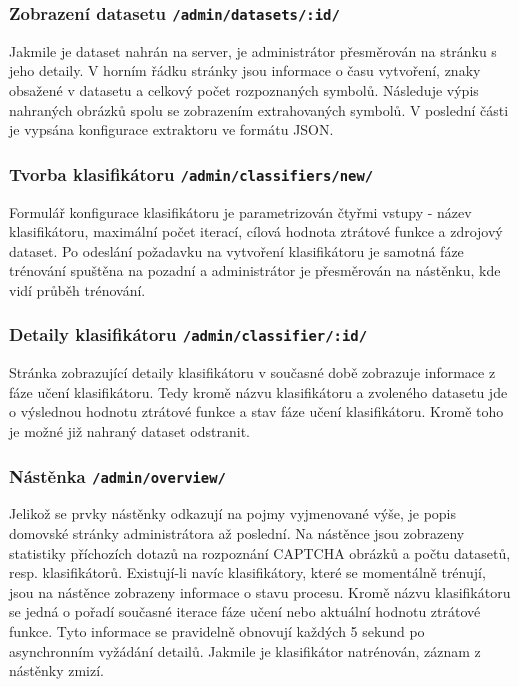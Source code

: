 \documentclass[
  field=ainfp,
  master=true,
  biblatex,
  sourcecodes=false,
  theorems=false,
  glossaries,
  index
]{kidiplom}
\begin{document}
\subsubsection*{Zobrazení datasetu \texttt{/admin/datasets/:id/}}
Jakmile je dataset nahrán na server, je administrátor přesměrován na stránku s jeho detaily. V horním řádku stránky jsou informace o času vytvoření, znaky obsažené v datasetu a celkový počet rozpoznaných symbolů. Následuje výpis nahraných obrázků spolu se zobrazením extrahovaných symbolů. V poslední části je vypsána konfigurace extraktoru ve formátu JSON. 

\subsubsection*{Tvorba klasifikátoru \texttt{/admin/classifiers/new/}}
Formulář konfigurace klasifikátoru je parametrizován čtyřmi vstupy - název klasifikátoru, maximální počet iterací, cílová hodnota ztrátové funkce a zdrojový dataset. Po odeslání požadavku na vytvoření klasifikátoru je samotná fáze trénování spuštěna na pozadní a administrátor je přesměrován na nástěnku, kde vidí průběh trénování.

\subsubsection*{Detaily klasifikátoru \texttt{/admin/classifier/:id/}}
Stránka zobrazující detaily klasifikátoru v současné době zobrazuje informace z fáze učení klasifikátoru. Tedy kromě názvu klasifikátoru a zvoleného datasetu jde o výslednou hodnotu ztrátové funkce a stav fáze učení klasifikátoru. Kromě toho je možné již nahraný dataset odstranit.

\subsubsection*{Nástěnka \texttt{/admin/overview/}}
Jelikož se prvky nástěnky odkazují na pojmy vyjmenované výše, je popis domovské stránky administrátora až poslední. Na nástěnce jsou zobrazeny statistiky příchozích dotazů na rozpoznání CAPTCHA obrázků a počtu datasetů, resp. klasifikátorů. Existují-li navíc klasifikátory, které se momentálně trénují, jsou na nástěnce zobrazeny informace o stavu procesu. Kromě názvu klasifikátoru se jedná o pořadí současné iterace fáze učení nebo aktuální hodnotu ztrátové funkce. Tyto informace se pravidelně obnovují každých 5 sekund po asynchronním vyžádání detailů. Jakmile je klasifikátor natrénován, záznam z nástěnky zmizí.
\end{document}
